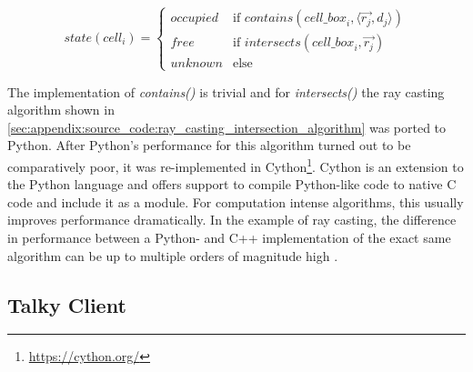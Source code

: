 $$
\textit{state}(cell_i) = 
\begin{cases}
	\textit{occupied} & \text{if\ } \textit{contains}(\textit{cell\_box}_i, \langle \vec{r_j}, d_j \rangle) \\
	\textit{free} & \text{if\ } \textit{intersects}(\textit{cell\_box}_i, \vec{r_j}) \\
	\textit{unknown} & \text{else}
\end{cases}
$$

The implementation of \textit{contains()} is trivial and for \textit{intersects()} the ray casting algorithm shown in \autoref{sec:appendix:source_code:ray_casting_intersection_algorithm} was ported to Python. After Python's performance for this algorithm turned out to be comparatively poor, it was re-implemented in Cython\footnote{\url{https://cython.org/}}. Cython is an extension to the Python language and offers support to compile Python-like code to native C code and include it as a module. For computation intense algorithms, this usually improves performance dramatically. In the example of ray casting, the difference in performance between a Python- and C++ implementation of the exact same algorithm can be up to multiple orders of magnitude high \cite{Novak2017}.


\subsection{Talky Client}
\label{subsec:implementation:talky_client}